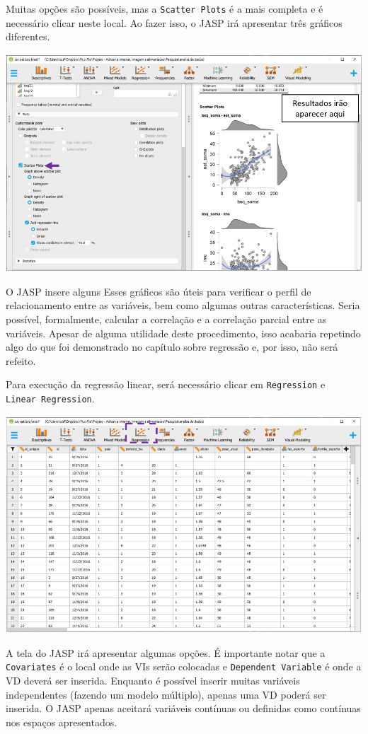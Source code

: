 \documentclass[
]{book}
\begin{document}
Muitas opções são possíveis, mas a \texttt{Scatter\ Plots} é a mais
completa e é necessário clicar neste local. Ao fazer isso, o JASP irá
apresentar três gráficos diferentes.

\includegraphics{./img/cap_reg_multipla_plots2.png}

O JASP insere alguns Esses gráficos são úteis para verificar o perfil de
relacionamento entre as variáveis, bem como algumas outras
características. Seria possível, formalmente, calcular a correlação e a
correlação parcial entre as variáveis. Apesar de alguma utilidade deste
procedimento, isso acabaria repetindo algo do que foi demonstrado no
capítulo sobre regressão e, por isso, não será refeito.

Para execução da regressão linear, será necessário clicar em
\texttt{Regression} e \texttt{Linear\ Regression}.

\includegraphics{./img/cap_reg_multipla_interface.png}

A tela do JASP irá apresentar algumas opções. É importante notar que a
\texttt{Covariates} é o local onde as VIs serão colocadas e
\texttt{Dependent\ Variable} é onde a VD deverá ser inserida. Enquanto é
possível inserir muitas variáveis independentes (fazendo um modelo
múltiplo), apenas uma VD poderá ser inserida. O JASP apenas aceitará
variáveis contínuas ou definidas como contínuas nos espaços
apresentados.
\end{document}
